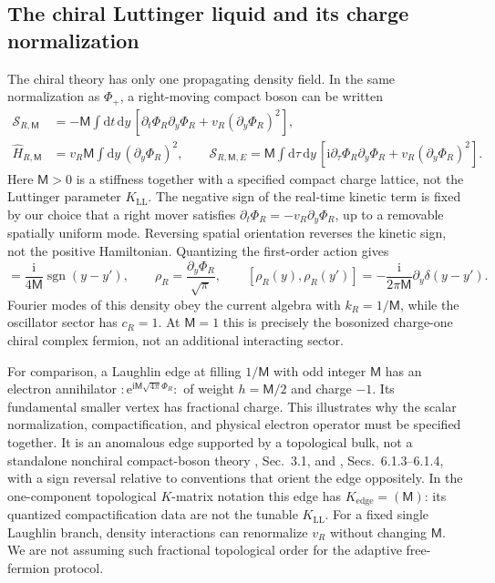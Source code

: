 \documentclass[aps,prb,onecolumn,nofootinbib,superscriptaddress]{revtex4-2}
\newcommand{\dd}{\mathrm{d}}
\newcommand{\ii}{\mathrm{i}}
\newcommand{\e}{\mathrm{e}}
\begin{document}
\subsection{The chiral Luttinger liquid and its charge normalization}
The chiral theory has only one propagating density field. In the same
normalization as $\Phi_+$, a right-moving compact boson can be written
\begin{align}
 \mathcal S_{R,\mathsf M}
 &=-\mathsf M\int\dd t\,\dd y\,
       [\partial_t\Phi_R\partial_y\Phi_R+v_R(\partial_y\Phi_R)^2],
 \label{eq:chiral-boson-action}\\
 \hat H_{R,\mathsf M}&=v_R\mathsf M\int\dd y\,(\partial_y\Phi_R)^2,
 \qquad
 \mathcal S_{R,\mathsf M,E}=\mathsf M\int\dd\tau\,\dd y\,
       [\ii\partial_\tau\Phi_R\partial_y\Phi_R
                              +v_R(\partial_y\Phi_R)^2].
 \label{eq:chiral-boson-euclidean}
\end{align}
Here $\mathsf M>0$ is a stiffness together with a specified compact charge
lattice, not the Luttinger parameter $K_{\mathrm{LL}}$.
The negative sign of the real-time kinetic term is fixed by our choice
that a right mover satisfies $\partial_t\Phi_R=-v_R\partial_y\Phi_R$,
up to a removable spatially uniform mode. Reversing spatial orientation
reverses the kinetic sign, not the positive Hamiltonian. Quantizing the
first-order action gives
\begin{equation}
 [\Phi_R(y),\Phi_R(y')]=\frac{\ii}{4\mathsf M}
                         \operatorname{sgn}(y-y'),\qquad
 \rho_R=\frac{\partial_y\Phi_R}{\sqrt\pi},\qquad
 [\rho_R(y),\rho_R(y')]
       =-\frac{\ii}{2\pi\mathsf M}\partial_y\delta(y-y').
 \label{eq:chiral-boson-bracket}
\end{equation}
Fourier modes of this density obey the current algebra with
$k_R=1/\mathsf M$, while the oscillator sector has $c_R=1$.
At $\mathsf M=1$ this is precisely the bosonized charge-one chiral
complex fermion, not an additional interacting sector.

For comparison, a Laughlin edge at filling $1/\mathsf M$ with odd
integer $\mathsf M$ has an electron annihilator
$:\!\e^{\ii\mathsf M\sqrt{4\pi}\Phi_R}\!:$ of weight
$h=\mathsf M/2$ and charge $-1$. Its fundamental smaller vertex has
fractional charge. This illustrates why the scalar normalization,
compactification, and physical electron operator must be specified
together. It is an anomalous edge supported by a topological bulk,
not a standalone nonchiral compact-boson theory
\cite{Wen1995}, Sec.~3.1, and \cite{TongQHE}, Secs.~6.1.3--6.1.4,
with a sign reversal relative to conventions that orient the edge
oppositely. In the one-component topological $K$-matrix notation this
edge has $K_{\mathrm{edge}}=(\mathsf M)$: its quantized compactification
data are not the tunable $K_{\mathrm{LL}}$. For a fixed single Laughlin
branch, density interactions can renormalize $v_R$ without changing
$\mathsf M$. We are not assuming such fractional topological order for
the adaptive free-fermion protocol.
\end{document}
